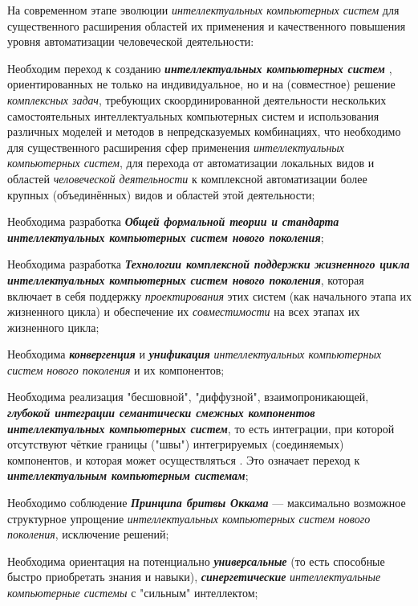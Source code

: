 На современном этапе эволюции \textit{интеллектуальных компьютерных систем} для существенного расширения областей их применения и качественного повышения уровня автоматизации человеческой деятельности:
\begin{textitemize}
	\item
	Необходим переход к созданию   \textbf{\textit{интеллектуальных компьютерных систем }}, ориентированных не только на индивидуальное, но и на  (совместное) решение \textit{комплексных задач}, требующих скоординированной деятельности нескольких самостоятельных интеллектуальных компьютерных систем и использования различных моделей и методов в непредсказуемых комбинациях, что необходимо для существенного расширения сфер применения \textit{интеллектуальных компьютерных систем}, для перехода от автоматизации локальных видов и областей \textit{человеческой деятельности} к комплексной автоматизации более крупных (объединённых) видов и областей этой деятельности;
	\item
	Необходима разработка \textbf{\textit{Общей формальной теории и стандарта интеллектуальных компьютерных систем нового поколения}};
	\item
	Необходима разработка \textbf{\textit{Технологии комплексной поддержки жизненного цикла интеллектуальных компьютерных систем нового поколения}}, которая включает в себя поддержку \textit{проектирования} этих систем (как начального этапа их жизненного цикла) и обеспечение их \textit{совместимости} на всех этапах их жизненного цикла;
	\item
	Необходима \textbf{\textit{конвергенция}} и \textbf{\textit{унификация}} \textit{интеллектуальных компьютерных систем нового поколения} и их компонентов;
	\item
	Необходима реализация "бесшовной"{}, "диффузной"{}, взаимопроникающей, \textbf{\textit{глубокой интеграции семантически смежных компонентов интеллектуальных компьютерных систем}}, то есть интеграции, при которой отсутствуют чёткие границы ("швы") интегрируемых (соединяемых) компонентов, и которая может осуществляться . Это означает переход к \textbf{\textit{ интеллектуальным компьютерным системам}};
	\item
	Необходимо соблюдение \textbf{\textit{Принципа бритвы Оккама}} --- максимально возможное структурное упрощение \textit{интеллектуальных компьютерных систем нового поколения}, исключение  решений;
	\item
	Необходима ориентация на потенциально \textbf{\textit{универсальные}} (то есть способные быстро приобретать  знания и навыки), \textbf{\textit{синергетические}} \textit{интеллектуальные компьютерные системы} с "сильным"{} интеллектом;
\end{textitemize}

